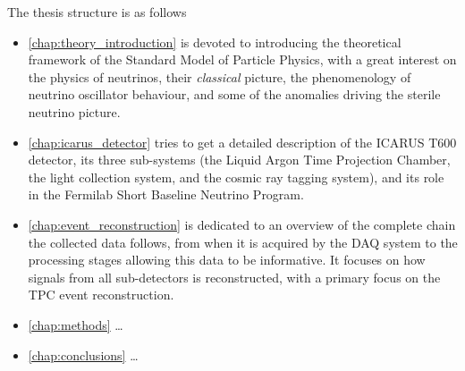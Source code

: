 The thesis structure is as follows
\begin{itemize}
    \item \autoref{chap:theory_introduction} is devoted to introducing the theoretical framework of the Standard Model of Particle Physics, with a great interest on the physics of neutrinos, their \emph{classical} picture, the phenomenology of neutrino oscillator behaviour, and some of the anomalies driving the sterile neutrino picture. 
    \item \autoref{chap:icarus_detector} tries to get a detailed description of the ICARUS T600 detector, its three sub-systems (the Liquid Argon Time Projection Chamber, the light collection system, and the cosmic ray tagging system), and its role in the Fermilab Short Baseline Neutrino Program. 
    \item \autoref{chap:event_reconstruction} is dedicated to an overview of the complete chain the collected data follows, from when it is acquired by the DAQ system to the processing stages allowing this data to be informative. It focuses on how signals from all sub-detectors is reconstructed, with a primary focus on the TPC event reconstruction. 
    \item \autoref{chap:methods} \dots
    \item \autoref{chap:conclusions} \dots
\end{itemize}

